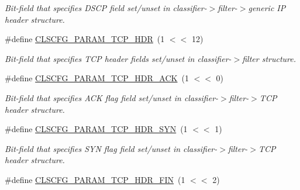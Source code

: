\begin{DoxyCompactItemize}
\begin{DoxyCompactList}\small\item\em Bit-\/field that specifies D\-S\-C\-P field set/unset in classifier-\/$>$filter-\/$>$generic I\-P header structure. \end{DoxyCompactList}\item 
\hypertarget{group__FAPI__QOS__CLASS_gacf8a4fb4dc4dcda1832c1bd55ffbc602}{\#define \hyperlink{group__FAPI__QOS__CLASS_gacf8a4fb4dc4dcda1832c1bd55ffbc602}{C\-L\-S\-C\-F\-G\-\_\-\-P\-A\-R\-A\-M\-\_\-\-T\-C\-P\-\_\-\-H\-D\-R}~(1 $<$$<$ 12)}\label{group__FAPI__QOS__CLASS_gacf8a4fb4dc4dcda1832c1bd55ffbc602}

\begin{DoxyCompactList}\small\item\em Bit-\/field that specifies T\-C\-P header fields set/unset in classifier-\/$>$filter structure. \end{DoxyCompactList}\item 
\hypertarget{group__FAPI__QOS__CLASS_ga687efbfecca4a115b554080f924dd061}{\#define \hyperlink{group__FAPI__QOS__CLASS_ga687efbfecca4a115b554080f924dd061}{C\-L\-S\-C\-F\-G\-\_\-\-P\-A\-R\-A\-M\-\_\-\-T\-C\-P\-\_\-\-H\-D\-R\-\_\-\-A\-C\-K}~(1 $<$$<$ 0)}\label{group__FAPI__QOS__CLASS_ga687efbfecca4a115b554080f924dd061}

\begin{DoxyCompactList}\small\item\em Bit-\/field that specifies A\-C\-K flag field set/unset in classifier-\/$>$filter-\/$>$T\-C\-P header structure. \end{DoxyCompactList}\item 
\hypertarget{group__FAPI__QOS__CLASS_gafc2f5f449c1d381846b0e241d7da1fec}{\#define \hyperlink{group__FAPI__QOS__CLASS_gafc2f5f449c1d381846b0e241d7da1fec}{C\-L\-S\-C\-F\-G\-\_\-\-P\-A\-R\-A\-M\-\_\-\-T\-C\-P\-\_\-\-H\-D\-R\-\_\-\-S\-Y\-N}~(1 $<$$<$ 1)}\label{group__FAPI__QOS__CLASS_gafc2f5f449c1d381846b0e241d7da1fec}

\begin{DoxyCompactList}\small\item\em Bit-\/field that specifies S\-Y\-N flag field set/unset in classifier-\/$>$filter-\/$>$T\-C\-P header structure. \end{DoxyCompactList}\item 
\hypertarget{group__FAPI__QOS__CLASS_ga181ee44f13f002b1dfc64b8ec8a6a6a1}{\#define \hyperlink{group__FAPI__QOS__CLASS_ga181ee44f13f002b1dfc64b8ec8a6a6a1}{C\-L\-S\-C\-F\-G\-\_\-\-P\-A\-R\-A\-M\-\_\-\-T\-C\-P\-\_\-\-H\-D\-R\-\_\-\-F\-I\-N}~(1 $<$$<$ 2)}\label{group__FAPI__QOS__CLASS_ga181ee44f13f002b1dfc64b8ec8a6a6a1}


\end{DoxyCompactItemize}
